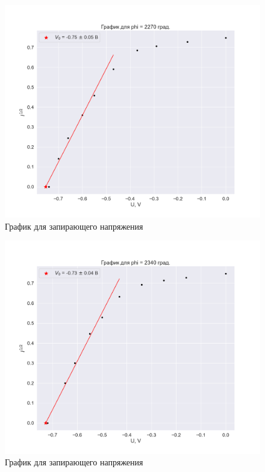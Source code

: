 \documentclass[a4paper, 12pt]{article}
\begin{document}
\begin{figure}[H]
    \centering
    \includegraphics[width=1\textwidth]{plot_zero2.png}
    \caption{График для запирающего напряжения}
\end{figure}

\begin{figure}[H]
    \centering
    \includegraphics[width=1\textwidth]{plot_zero3.png}
    \caption{График для запирающего напряжения}
\end{figure}
\end{document}
